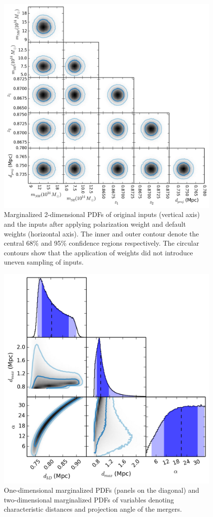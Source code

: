 \documentclass[letterpaper,useAMS,usenatbib]{mn2e}
\begin{document}
\begin{figure}
	\begin{minipage}{180mm}
	\begin{center}
	\includegraphics[width=0.65\linewidth]{TwoMnWBSG_inputsVsinput.png}
	\caption{Marginalized 2-dimensional PDFs of original inputs (vertical axis) 
		and the inputs after applying polarization weight and default weights 
		(horizontal axis). The inner and outer contour
denote the central 68\% and 95\% confidence regions respectively.
The circular contours show that the application of weights did not introduce
uneven sampling of inputs. }
	\end{center}
	\end{minipage}
\end{figure}
\begin{figure}
\begin{minipage}{180mm}
	\begin{center}
	\includegraphics[width=0.5\linewidth]{TwoMnWBSG_tri_geo.png}
	\caption{One-dimensional marginalized PDFs (panels on the diagonal) and
		two-dimensional marginalized PDFs of variables
		denoting characteristic distances and projection angle of the mergers.
	\label{fig:geom_geom}
	}
	\end{center}
	\end{minipage}
\end{figure}
\end{document}
